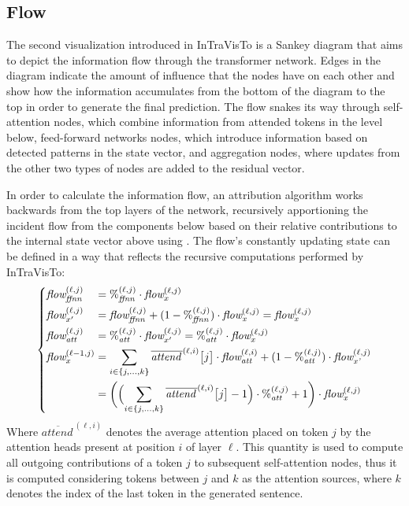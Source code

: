 \subsection{Flow}

The second visualization introduced in InTraVisTo is a Sankey diagram  that aims to depict the information flow through the transformer network.
Edges in the diagram indicate the amount of influence that the nodes have on each other and show how the information accumulates from the bottom of the diagram to the top in order to generate the final prediction.
The flow snakes its way through self-attention nodes, which combine information from attended tokens in the level below, feed-forward networks nodes, which introduce information based on detected patterns in the state vector, and aggregation nodes, where updates from the other two types of nodes are added to the residual vector.

In order to calculate the information flow, an attribution algorithm works backwards from the top layers of the network, recursively apportioning the incident flow from the components below based on their relative contributions to the internal state vector above using .
The flow's constantly updating state can be defined in a way that reflects the recursive computations performed by InTraVisTo:
\begin{equation}
    \left\{
    \begin{alignedat}{2}
        &\textit{flow}_{\textit{ffnn}}^{(\ell,j)} &&= {\%}_{\textit{ffnn}}^{(\ell,j)} \cdot \textit{flow}_{x}^{(\ell,j)} \\
        &\textit{flow}_{x'}^{(\ell,j)} &&= \textit{flow}_{\textit{ffnn}}^{(\ell,j)} + (1 - {\%}_{\textit{ffnn}}^{(\ell,j)}) \cdot \textit{flow}_{\textit{x}}^{(\ell,j)} = \textit{flow}_{\textit{x}}^{(\ell,j)} \\
        &\textit{flow}_{\textit{att}}^{(\ell,j)} &&= {\%}_{\textit{att}}^{(\ell,j)} \cdot \textit{flow}_{x'}^{(\ell,j)} = {\%}_{\textit{att}}^{(\ell,j)} \cdot \textit{flow}_{x}^{(\ell,j)} \\
        &\textit{flow}_{x}^{(\ell-1,j)} &&= \sum_{i\in\{j,\ldots,k\}}{\overline{\textit{attend}{\,}}^{(\ell,i)}\bigl[j\bigr]}\cdot\textit{flow}_{\textit{att}}^{(\ell,i)} + ( 1 - {\%}_{\textit{att}}^{(\ell,j)})\cdot \textit{flow}_{\textit{x'}}^{(\ell,j)} \\
            &\quad &&= \biggl(\Bigl(\sum_{i\in\{j,\ldots,k\}}\overline{\textit{attend}{\,}}^{(\ell,i)}\bigl[j\bigr] - 1\Bigr)\cdot{\%}_{\textit{att}}^{(\ell,j)} + 1\biggr) \cdot \textit{flow}_{\textit{x}}^{(\ell,j)}
    \end{alignedat}
    \right.
\end{equation}
Where $\overline{\textit{attend}{\,}}^{(\ell,i)}$ denotes the average attention placed on token $j$ by the attention heads present at position $i$ of layer $\ell$.
This quantity is used to compute all outgoing contributions of a token $j$ to subsequent self-attention nodes, thus it is computed considering tokens between $j$ and $k$ as the attention sources, where $k$ denotes the index of the last token in the generated sentence.

